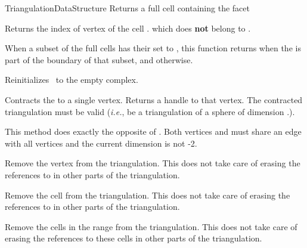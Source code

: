 \begin{ccRefConcept}{TriangulationDataStructure}
{Returns a full cell containing the facet }

{Returns the index of vertex of the cell \ccVar.
which does \textbf{not} belong to .}


\begin{ccAdvanced}

{When a subset of the full cells has their  set to , this
function returns  when the  is part of the boundary of
that subset, and  otherwise.
}

\end{ccAdvanced}


{Reinitializes \ccVar\ to the empty complex.}

 {Contracts the
 to a single vertex. Returns a handle to that vertex. \ccPrecond
The contracted triangulation must be valid (\emph{i.e.}, be a triangulation of
a sphere of dimension \ccVar.).}

 {This method does exactly the opposite of
. \ccPrecond Both vertices  and
 must share an edge with all vertices and the current
dimension is not -2.}

\begin{ccAdvanced}

{Remove the vertex  from the triangulation. This does not take care of
erasing the references to  in other parts of the triangulation.}

{Remove the cell  from the triangulation. This does not take care of
erasing the references to  in other parts of the triangulation.}

{Remove the cells in the range \ccc{[start,end)} from the triangulation.
This does not take care of erasing the references to these cells in other parts of
the triangulation.}


\end{ccAdvanced}
\end{ccRefConcept}
